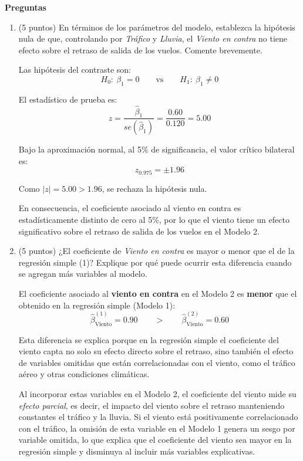 \documentclass[10pt,a4paper]{article}
\begin{document}
\begin{enumerate}
\textbf{Preguntas}
\begin{enumerate}

    \item[(a)] (5 puntos) En términos de los parámetros del modelo, establezca la hipótesis nula de que, controlando por \textit{Tráfico} y \textit{Lluvia}, el \textit{Viento en contra} no tiene efecto sobre el retraso de salida de los vuelos. Comente brevemente.

\color{blue}
Las hipótesis del contraste son:
\[
H_0:\ \beta_1 = 0
\qquad \text{vs} \qquad
H_1:\ \beta_1 \neq 0
\]

El estadístico de prueba es:
\[
z = \frac{\hat\beta_1}{se(\hat\beta_1)}
  = \frac{0.60}{0.120}
  = 5.00
\]

Bajo la aproximación normal, al 5\% de significancia, el valor crítico bilateral es:
\[
z_{0.975} = \pm 1.96
\]

Como \(|z| = 5.00 > 1.96\), se rechaza la hipótesis nula.

En consecuencia, el coeficiente asociado al viento en contra es estadísticamente distinto de cero
al 5\%, por lo que el viento tiene un efecto significativo sobre el retraso de salida de los vuelos
en el Modelo 2.
\color{black}
    \item[(b)] (5 puntos) ¿El coeficiente de \textit{Viento en contra} es mayor o menor que el de la regresión simple (1)? Explique por qué puede ocurrir esta diferencia cuando se agregan más variables al modelo.

\color{blue}

El coeficiente asociado al \textbf{viento en contra} en el Modelo 2 es \textbf{menor} que el obtenido
en la regresión simple (Modelo 1):
\[
\hat\beta^{(1)}_{\text{Viento}} = 0.90 
\qquad > \qquad
\hat\beta^{(2)}_{\text{Viento}} = 0.60
\]

Esta diferencia se explica porque en la regresión simple el coeficiente del viento capta no solo su
efecto directo sobre el retraso, sino también el efecto de variables omitidas que están correlacionadas
con el viento, como el tráfico aéreo y otras condiciones climáticas.

Al incorporar estas variables en el Modelo 2, el coeficiente del viento mide su \emph{efecto parcial},
es decir, el impacto del viento sobre el retraso manteniendo constantes el tráfico y la lluvia.
Si el viento está positivamente correlacionado con el tráfico, la omisión de esta variable en el
Modelo 1 genera un sesgo por variable omitida, lo que explica que el coeficiente del viento sea mayor
en la regresión simple y disminuya al incluir más variables explicativas.


\end{enumerate}
\end{enumerate}
\end{document}
